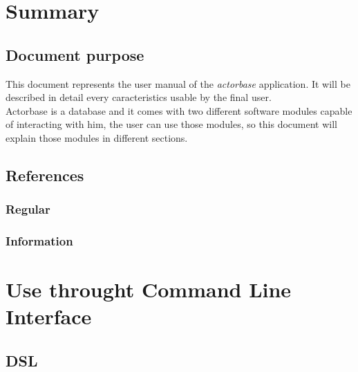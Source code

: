 \documentclass{scalatekids-article}
\begin{document}
\section{Summary}
\subsection{Document purpose}
This document represents the user manual of the \textit{actorbase} application. It will be described in detail every caracteristics usable by the final user.\\
Actorbase is a database and it comes with two different software modules capable of interacting with him, the user can use those modules, so this document will explain those modules in different sections.

\prodPurpose

\subsection{References}

\subsubsection{Regular} %

\subsubsection{Information} %




\section{Use throught Command Line Interface}

\subsection{DSL}
\end{document}
